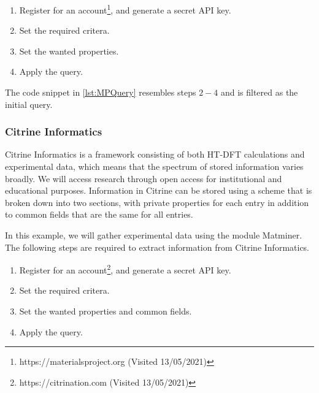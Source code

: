 \begin{enumerate}
  \item Register for an account\footnote{https://materialsproject.org (Visited 13/05/2021)}, and generate a secret API key.
  \item Set the required critera.
  \item Set the wanted properties.
  \item Apply the query.
\end{enumerate}

\noindent The code snippet in \autoref{lst:MPQuery} resembles steps $2-4$ and is filtered as the initial query. %

\subsubsection{Citrine Informatics}

Citrine Informatics is a framework consisting of both HT-DFT calculations and experimental data, which means that the spectrum of stored information varies broadly. We will access research through open access for institutional and educational purposes. Information in Citrine can be stored using a scheme that is broken down into two sections, with private properties for each entry in addition to common fields that are the same for all entries.%

In this example, we will gather experimental data using the module Matminer. The following steps are required to extract information from Citrine Informatics.

\begin{enumerate}
  \item Register for an account\footnote{https://citrination.com (Visited 13/05/2021)}, and generate a secret API key.
  \item Set the required critera.
  \item Set the wanted properties and common fields.
  \item Apply the query.
\end{enumerate}

